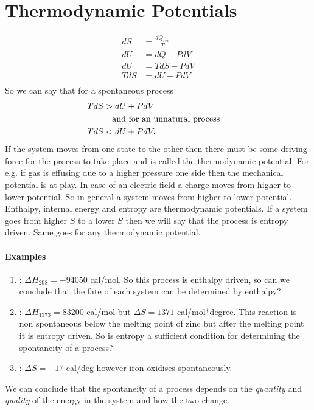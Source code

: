 \documentclass[12pt]{article}
\begin{document}
\section{Thermodynamic Potentials}
\begin{align*}
	dS&=\frac{dQ_{rev}}{T} \\
   dU&=dQ-PdV\\
   dU&=TdS-PdV\\
   TdS&=dU+PdV\\
\end{align*}
So we can say that for a spontaneous process
\begin{align}
	TdS&>dU+PdV\\
	&\qq{and for an unnatural process} \\
	TdS&<dU+PdV.
\end{align}
If the system moves from one state to the other then there must be some driving force for the process to take place and is called the thermodynamic potential. For e.g. if gas is effusing due to a higher pressure one side then the mechanical potential is at play. In case of an electric field a charge moves from higher to lower potential. So in general a system moves from higher to lower potential. Enthalpy, internal energy and entropy are thermodynamic potentials. If a system goes from higher $S$ to a lower $S$ then we will say that the process is entropy driven. Same goes for any thermodynamic potential. 
\paragraph*{Examples}
\begin{enumerate}
	\item {} \quad: $\Delta H_{298}=-94050$ cal/mol. So this process is enthalpy driven, so can we conclude that the fate of each system can be determined by enthalpy?
	\item {} \quad: $\Delta H_{1373}=83200$ cal/mol but $ \Delta S=1371 $ cal/mol*degree. This reaction is non spontaneous below the melting point of zinc but after the melting point it is entropy driven. So is entropy a sufficient condition for determining the spontaneity of a process? 
	\item {}\quad: $\Delta S=-17$ cal/deg  however iron oxidises spontaneously. 
	
\end{enumerate}
We can conclude that the spontaneity of a process depends on the \textit{quantity} and \textit{quality} of the energy in the system and how the two change.
\end{document}
